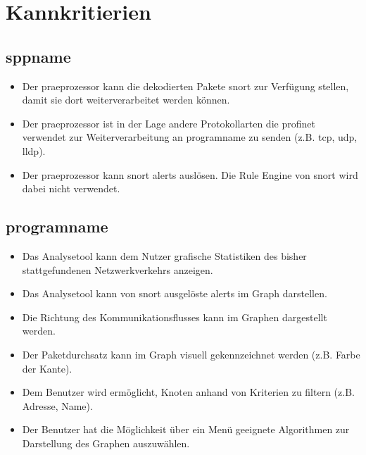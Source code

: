 \section{Kannkritierien}

\subsection{\gls{sppname}}

\begin{itemize}

\item Der \gls{praeprozessor} kann die dekodierten Pakete \gls{snort} zur Verfügung stellen, damit sie dort weiterverarbeitet werden können.

\item Der \gls{praeprozessor} ist in der Lage andere Protokollarten die \gls{profinet} verwendet zur Weiterverarbeitung an \gls{programname} zu senden (z.B. \gls{tcp}, \gls{udp}, \gls{lldp}).

\item Der \gls{praeprozessor} kann \gls{snort} \glspl{alert} auslösen. Die Rule Engine von \gls{snort} wird dabei nicht verwendet.
\end{itemize}

\subsection{\gls{programname}}

\begin{itemize}
\item Das Analysetool kann dem Nutzer grafische Statistiken des bisher stattgefundenen Netzwerkverkehrs anzeigen.

\item Das Analysetool kann von \gls{snort} ausgelöste \glspl{alert} im Graph darstellen.

\item Die Richtung des Kommunikationsflusses kann im Graphen dargestellt werden.

\item Der Paketdurchsatz kann im Graph visuell gekennzeichnet werden (z.B. Farbe der Kante).

\item Dem Benutzer wird ermöglicht, Knoten anhand von Kriterien zu filtern (z.B. Adresse, Name).

\item Der Benutzer hat die Möglichkeit über ein Menü geeignete Algorithmen zur Darstellung des Graphen auszuwählen.
\end{itemize}

